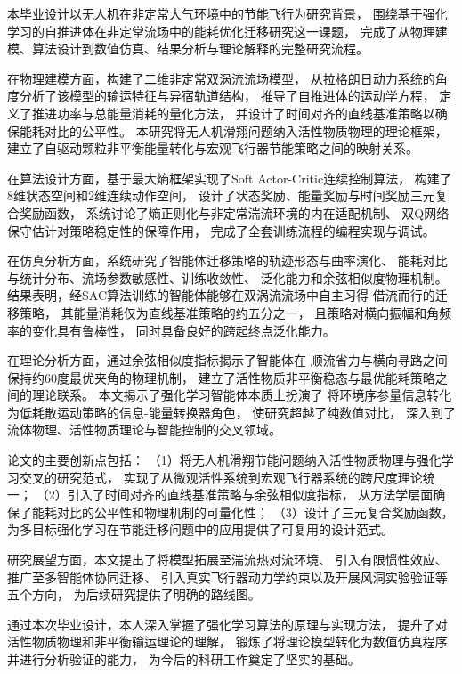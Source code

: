 ﻿%

\begin{designsummary}
本毕业设计以无人机在非定常大气环境中的节能飞行为研究背景，
围绕基于强化学习的自推进体在非定常流场中的能耗优化迁移研究这一课题，
完成了从物理建模、算法设计到数值仿真、结果分析与理论解释的完整研究流程。

在物理建模方面，构建了二维非定常双涡流流场模型，
从拉格朗日动力系统的角度分析了该模型的输运特征与异宿轨道结构，
推导了自推进体的运动学方程，
定义了推进功率与总能量消耗的量化方法，
并设计了时间对齐的直线基准策略以确保能耗对比的公平性。
本研究将无人机滑翔问题纳入活性物质物理的理论框架，
建立了自驱动颗粒非平衡能量转化与宏观飞行器节能策略之间的映射关系。

在算法设计方面，基于最大熵框架实现了Soft Actor-Critic连续控制算法，
构建了8维状态空间和2维连续动作空间，
设计了状态奖励、能量奖励与时间奖励三元复合奖励函数，
系统讨论了熵正则化与非定常湍流环境的内在适配机制、
双Q网络保守估计对策略稳定性的保障作用，
完成了全套训练流程的编程实现与调试。

在仿真分析方面，系统研究了智能体迁移策略的轨迹形态与曲率演化、
能耗对比与统计分布、流场参数敏感性、训练收敛性、
泛化能力和余弦相似度物理机制。
结果表明，经SAC算法训练的智能体能够在双涡流流场中自主习得
借流而行的迁移策略，
其能量消耗仅为直线基准策略的约五分之一，
且策略对横向振幅和角频率的变化具有鲁棒性，
同时具备良好的跨起终点泛化能力。

在理论分析方面，通过余弦相似度指标揭示了智能体在
顺流省力与横向寻路之间保持约60度最优夹角的物理机制，
建立了活性物质非平衡稳态与最优能耗策略之间的理论联系。
本文揭示了强化学习智能体本质上扮演了
将环境序参量信息转化为低耗散运动策略的信息-能量转换器角色，
使研究超越了纯数值对比，
深入到了流体物理、活性物质理论与智能控制的交叉领域。

论文的主要创新点包括：
（1）将无人机滑翔节能问题纳入活性物质物理与强化学习交叉的研究范式，
实现了从微观活性系统到宏观飞行器系统的跨尺度理论统一；
（2）引入了时间对齐的直线基准策略与余弦相似度指标，
从方法学层面确保了能耗对比的公平性和物理机制的可量化性；
（3）设计了三元复合奖励函数，
为多目标强化学习在节能迁移问题中的应用提供了可复用的设计范式。

研究展望方面，本文提出了将模型拓展至湍流热对流环境、
引入有限惯性效应、推广至多智能体协同迁移、
引入真实飞行器动力学约束以及开展风洞实验验证等五个方向，
为后续研究提供了明确的路线图。

通过本次毕业设计，本人深入掌握了强化学习算法的原理与实现方法，
提升了对活性物质物理和非平衡输运理论的理解，
锻炼了将理论模型转化为数值仿真程序并进行分析验证的能力，
为今后的科研工作奠定了坚实的基础。
\end{designsummary}

